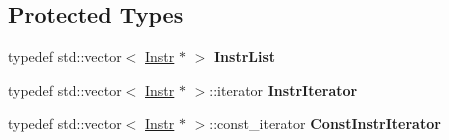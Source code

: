 \subsection*{Protected Types}
\begin{DoxyCompactItemize}
\item 
typedef std\+::vector$<$ \hyperlink{classRTSim_1_1Instr}{Instr} $\ast$ $>$ {\bfseries Instr\+List}\hypertarget{classRTSim_1_1Task_a18432efb06bcbd664305aa1fc24b1808}{}\label{classRTSim_1_1Task_a18432efb06bcbd664305aa1fc24b1808}

\item 
typedef std\+::vector$<$ \hyperlink{classRTSim_1_1Instr}{Instr} $\ast$ $>$\+::iterator {\bfseries Instr\+Iterator}\hypertarget{classRTSim_1_1Task_a37840524bc49eda22440fe31ce0a1873}{}\label{classRTSim_1_1Task_a37840524bc49eda22440fe31ce0a1873}

\item 
typedef std\+::vector$<$ \hyperlink{classRTSim_1_1Instr}{Instr} $\ast$ $>$\+::const\+\_\+iterator {\bfseries Const\+Instr\+Iterator}\hypertarget{classRTSim_1_1Task_a04a42fd1bebba82dae0aa35295b97dfd}{}\label{classRTSim_1_1Task_a04a42fd1bebba82dae0aa35295b97dfd}

\end{DoxyCompactItemize}

